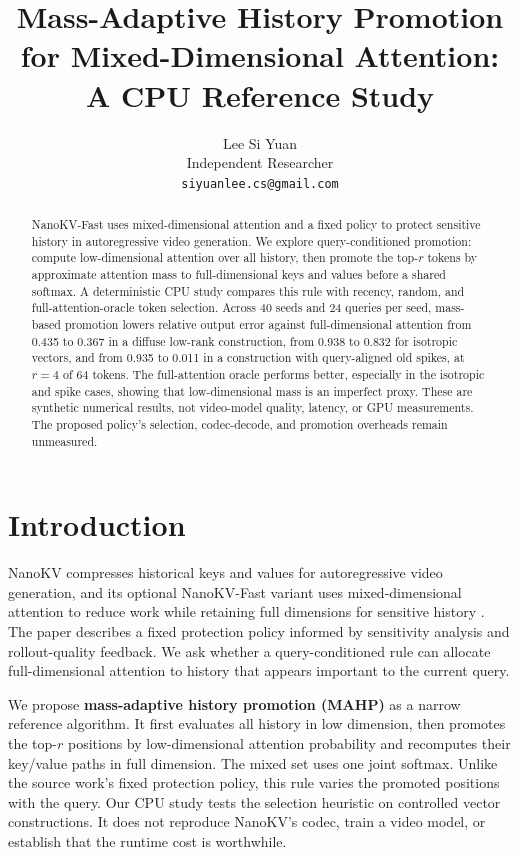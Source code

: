 \documentclass[11pt]{article}
\title{Mass-Adaptive History Promotion for Mixed-Dimensional Attention: A CPU Reference Study}
\author{Lee Si Yuan \\
  Independent Researcher \\
  \texttt{siyuanlee.cs@gmail.com}}
\begin{document}
\maketitle
\begin{abstract}
NanoKV-Fast uses mixed-dimensional attention and a fixed policy to protect sensitive history in autoregressive video generation. We explore query-conditioned promotion: compute low-dimensional attention over all history, then promote the top-$r$ tokens by approximate attention mass to full-dimensional keys and values before a shared softmax. A deterministic CPU study compares this rule with recency, random, and full-attention-oracle token selection. Across 40 seeds and 24 queries per seed, mass-based promotion lowers relative output error against full-dimensional attention from 0.435 to 0.367 in a diffuse low-rank construction, from 0.938 to 0.832 for isotropic vectors, and from 0.935 to 0.011 in a construction with query-aligned old spikes, at $r=4$ of 64 tokens. The full-attention oracle performs better, especially in the isotropic and spike cases, showing that low-dimensional mass is an imperfect proxy. These are synthetic numerical results, not video-model quality, latency, or GPU measurements. The proposed policy's selection, codec-decode, and promotion overheads remain unmeasured.
\end{abstract}

\section{Introduction}
NanoKV compresses historical keys and values for autoregressive video generation, and its optional NanoKV-Fast variant uses mixed-dimensional attention to reduce work while retaining full dimensions for sensitive history \citep{lu2026nanokv}. The paper describes a fixed protection policy informed by sensitivity analysis and rollout-quality feedback. We ask whether a query-conditioned rule can allocate full-dimensional attention to history that appears important to the current query.

We propose \textbf{mass-adaptive history promotion (MAHP)} as a narrow reference algorithm. It first evaluates all history in low dimension, then promotes the top-$r$ positions by low-dimensional attention probability and recomputes their key/value paths in full dimension. The mixed set uses one joint softmax. Unlike the source work's fixed protection policy, this rule varies the promoted positions with the query. Our CPU study tests the selection heuristic on controlled vector constructions. It does not reproduce NanoKV's codec, train a video model, or establish that the runtime cost is worthwhile.
\end{document}
